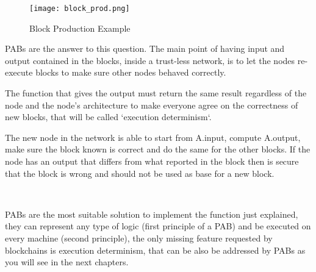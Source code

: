 \documentclass[../main.tex]{subfiles}
\begin{document}
\begin{figure}[h]
  \centering
  \texttt{[image: block\_prod.png]}
  \caption{Block Production Example}
  \label{fig:block_prod}
\end{figure}

PABs are the answer to this question. The main point of having input and output contained in the blocks, inside a trust-less network, is to let the nodes re-execute blocks to make sure other nodes behaved correctly.

The function that gives the output must return the same result regardless of the node and the node's architecture to make everyone agree on the correctness of new blocks, that will be called `execution determinism`.

The new node in the network is able to start from A.input, compute A.output, make sure the block known is correct and do the same for the other blocks. If the node has an output that differs from what reported in the block then is secure that the block is wrong and should not be used as base for a new block.

\

PABs are the most suitable solution to implement the function just explained, they can represent any type of logic (first principle of a PAB) and be executed on every machine (second principle), the only missing feature requested by blockchains is execution determinism, that can be also be addressed by PABs as you will see in the next chapters.
\end{document}
